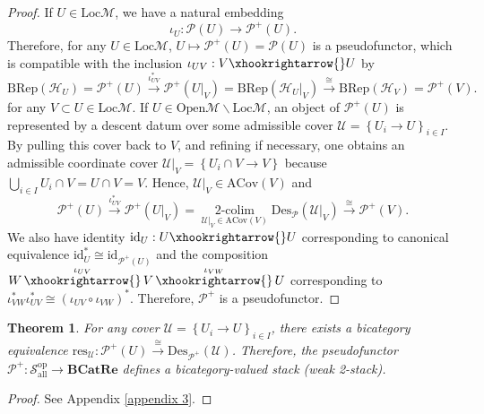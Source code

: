 \documentclass[reqno]{amsart}
\newtheorem{theorem}[formula]{Theorem}
\theoremstyle{definition}
\theoremstyle{remark}
\begin{document}
\begin{proof}
    If $U \in \text{Loc}\mathcal{M}$, we have a natural embedding 
    \begin{equation}
        \iota_U: \mathscr{P}(U)  \longrightarrow \mathscr{P}^+(U).
    \end{equation}
    Therefore, for any $U \in \text{Loc}\mathcal{M}$, $U \longmapsto \mathscr{P}^+(U)=\mathscr{P}(U)$ is a pseudofunctor, which is compatible with the inclusion $\iota_{UV}:V\xhookrightarrow{} U$ by 
    \begin{equation}
        \text{BRep}(\mathscr{H}_U)=\mathscr{P}^+(U)\mathop{\longrightarrow}\limits^{\iota^*_{UV}} \mathscr{P}^+(U|_V)= \text{BRep}(\mathscr{H}_{U}|_V)\mathop{\longrightarrow}\limits^{\cong} \text{BRep}(\mathscr{H}_{V})= \mathscr{P}^+(V).
    \end{equation}
    for any $V\subset U \in \text{Loc}\mathcal{M}$.
If $U \in \text{Open}\mathcal{M}\backslash\text{Loc}\mathcal{M}$, an object of $\mathscr{P}^+(U)$ is represented by a descent datum over some admissible cover $\mathcal{U}=\left\{U_i\longrightarrow U\right\}_{i \in I}$. By pulling this cover back to $V$, and refining if necessary, one obtains an admissible coordinate cover $\mathcal{U}|_V=\left\{U_i \cap V \longrightarrow V\right\}$ because $\bigcup\limits_{i\in I}U_i \cap V = U \cap V=V$. Hence, $\mathcal{U}|_V \in \text{ACov}(V)$ and
    \begin{equation}
        \mathscr{P}^+(U)\mathop{\longrightarrow}\limits^{\iota^*_{UV}}\mathscr{P}^+(U|_V)=\mathop{2\text{-colim}}\limits_{\mathcal{U}|_V\in\text{ACov}(V)}{\text{Des}_\mathscr{P}(\mathcal{U}|_V)} \mathop{\longrightarrow}\limits^{\cong} \mathscr{P}^+(V).
    \end{equation}
We also have identity $\text{id}_U:U\xhookrightarrow{} U$ corresponding to canonical equivalence $\text{id}_U^* \cong \text{id}_{\mathscr{P}^+(U)}$ and the composition $W \mathop{\xhookrightarrow{}}\limits^{\iota_{UV}}V \mathop{\xhookrightarrow{}}\limits^{\iota_{VW}} U$ corresponding to $\iota^*_{VW}\iota^*_{UV} \cong (\iota_{UV}\circ \iota_{VW})^*$. Therefore, $\mathscr{P}^+$ is a pseudofunctor.
\end{proof}

\begin{theorem}\label{theorem:stackification}
    For any cover $\mathcal{U}=\left\{U_i\longrightarrow U\right\}_{i\in I}$, there exists a bicategory equivalence $\text{res}_\mathcal{U}:\mathscr{P}^+(U) \mathop{\longrightarrow}\limits^{\cong} \text{Des}_{\mathscr{P}^+}(\mathcal{U})$. Therefore, the pseudofunctor $\mathscr{P}^+:\mathscr{S}_{\text{all}}^{\text{op}}\longrightarrow \textbf{BCatRe}$ defines a bicategory-valued stack (weak 2-stack).
\end{theorem}
\begin{proof}
    See Appendix \ref{appendix 3}.
\end{proof} 
\end{document}
